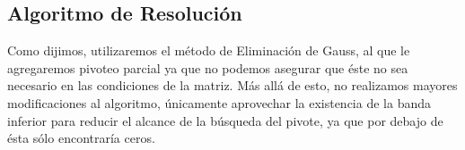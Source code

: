 \subsection{Algoritmo de Resolución}
Como dijimos, utilizaremos el método de Eliminación de Gauss, al que le agregaremos pivoteo parcial  ya que no podemos asegurar que éste no sea necesario en las condiciones de la matriz. Más allá de esto, no realizamos mayores modificaciones al algoritmo, únicamente aprovechar la existencia de la banda inferior para reducir el alcance de la búsqueda del pivote, ya que por debajo de ésta sólo encontraría ceros.




